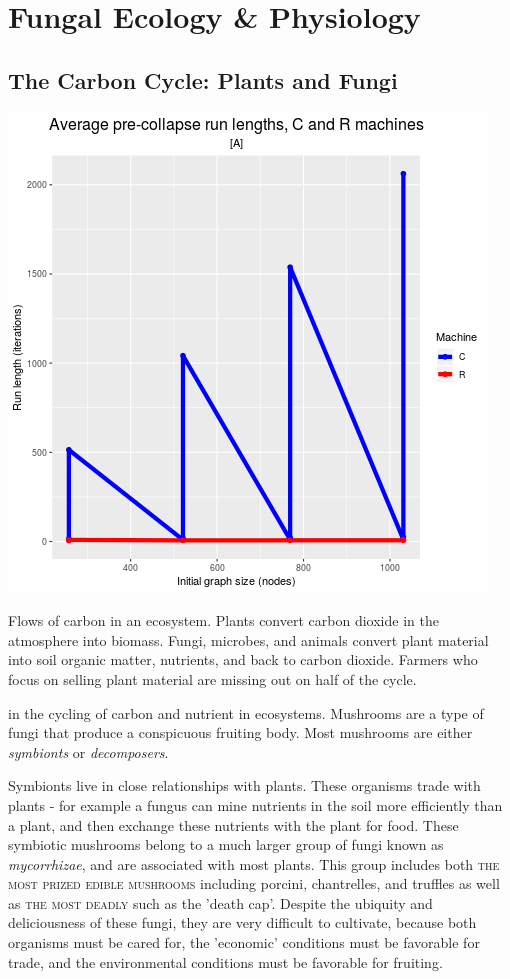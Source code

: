\documentclass{tufte-handout}
\begin{document}
\section{Fungal Ecology \&  Physiology}



\subsection{The Carbon Cycle: Plants and Fungi}

\begin{marginfigure}
\includegraphics{figA.png}
\caption{Flows of carbon in an ecosystem.
Plants convert carbon dioxide in the atmosphere into biomass. Fungi, microbes, and animals convert plant material into soil organic matter, nutrients, and back to carbon dioxide.
Farmers who focus on selling plant material are missing out on half of the cycle.}
\end{marginfigure}

 in the cycling of carbon and nutrient in ecosystems. Mushrooms are a type of fungi that produce a conspicuous 
fruiting body. Most mushrooms are either \emph{symbionts} or \emph{decomposers}.

Symbionts live in close relationships with plants. 
These organisms trade with plants - for example a fungus can mine nutrients in the soil more efficiently than a plant, and then exchange these nutrients with the plant for food.
These symbiotic mushrooms belong to a much larger group of fungi known as \emph{mycorrhizae}, and are associated with most plants. This group includes both \textsc{the most prized edible mushrooms} including porcini, chantrelles, and truffles as well as \textsc{the most deadly} such as the 'death cap'. 
Despite the ubiquity and deliciousness of these fungi, they are very difficult to cultivate, because both organisms must be cared for, the 'economic' conditions must be favorable for trade, and the environmental conditions must be favorable for fruiting.
\end{document}
